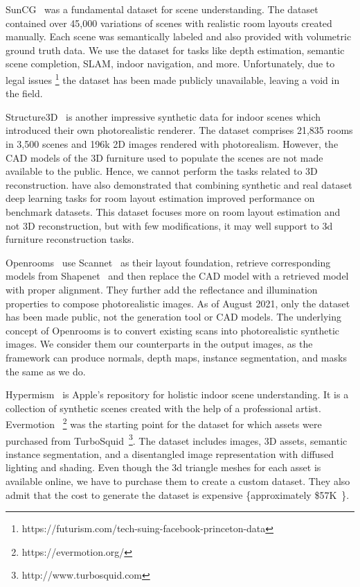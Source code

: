 SunCG~\cite{Song2017SemanticSC} was a fundamental dataset for scene understanding.
The dataset contained over 45,000 variations of scenes with realistic room layouts created manually.
Each scene was semantically labeled and also provided with volumetric ground truth data.
We use the dataset for tasks like depth estimation, semantic scene completion, SLAM, indoor navigation, and more.
Unfortunately, due to legal issues \footnote{https://futurism.com/tech-suing-facebook-princeton-data} the dataset has been made publicly unavailable, leaving a void in the field.

Structure3D~\cite{zheng2020structured3d} is another impressive synthetic data for indoor scenes which introduced their own photorealistic renderer.
The dataset comprises 21,835 rooms in 3,500 scenes and 196k 2D images rendered with photorealism.
However, the CAD models of the 3D furniture used to populate the scenes are not made available to the public.
Hence, we cannot perform the tasks related to  3D reconstruction.
\cite{zheng2020structured3d} have also demonstrated that combining synthetic and real dataset deep learning tasks for room layout estimation improved performance on benchmark datasets.
This dataset focuses more on room layout estimation and not 3D reconstruction, but with few modifications, it may well support to 3d furniture reconstruction tasks.

Openrooms~\cite{li2021openrooms} use Scannet~\cite{dai2017scannet} as their layout foundation, retrieve corresponding models from Shapenet~\cite{chang2015shapenet}
and then replace the CAD model with a retrieved model with proper alignment.
They further add the reflectance and illumination properties to compose photorealistic images.
As of August 2021, only the dataset has been made public, not the generation tool or CAD models.
The underlying concept of Openrooms is to convert existing scans into photorealistic synthetic images.
We consider them our counterparts in the output images, as the framework can produce normals, depth maps, instance segmentation, and masks the same as we do.

Hypermism~\cite{Roberts2020HypersimAP} is Apple's repository for holistic indoor scene understanding.
It is a collection of synthetic scenes created with the help of a professional artist.
Evermotion ~\footnote{https://evermotion.org/} was the starting point for the dataset for which assets were purchased from TurboSquid~\footnote{http://www.turbosquid.com}.
The dataset includes images, 3D assets, semantic instance segmentation, and a disentangled image representation with diffused lighting and shading.
Even though the 3d triangle meshes for each asset is available online, we have to purchase them to create a custom dataset.
They also admit that the cost to generate the dataset is expensive \{approximately \$57K~\cite{Roberts2020HypersimAP}\}.

